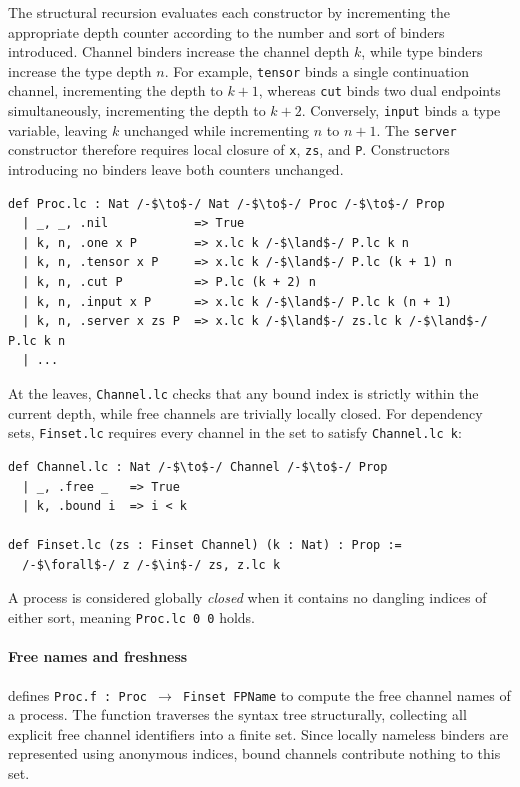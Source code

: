 The structural recursion evaluates each constructor by incrementing the appropriate depth counter according to the number and sort of binders introduced. Channel binders increase the channel depth $k$, while type binders increase the type depth $n$. For example, \texttt{tensor} binds a single continuation channel, incrementing the depth to $k+1$, whereas \texttt{cut} binds two dual endpoints simultaneously, incrementing the depth to $k+2$. Conversely, \texttt{input} binds a type variable, leaving $k$ unchanged while incrementing $n$ to $n+1$. The \texttt{server} constructor therefore requires local closure of \texttt{x}, \texttt{zs}, and \texttt{P}. Constructors introducing no binders leave both counters unchanged.

\begin{lstlisting}[language=Lean4]
def Proc.lc : Nat /-$\to$-/ Nat /-$\to$-/ Proc /-$\to$-/ Prop
  | _, _, .nil            => True
  | k, n, .one x P        => x.lc k /-$\land$-/ P.lc k n
  | k, n, .tensor x P     => x.lc k /-$\land$-/ P.lc (k + 1) n
  | k, n, .cut P          => P.lc (k + 2) n
  | k, n, .input x P      => x.lc k /-$\land$-/ P.lc k (n + 1)
  | k, n, .server x zs P  => x.lc k /-$\land$-/ zs.lc k /-$\land$-/ P.lc k n
  | ...
\end{lstlisting}

At the leaves, \texttt{Channel.lc} checks that any bound index is strictly within the current depth, while free channels are trivially locally closed. For dependency sets, \texttt{Finset.lc} requires every channel in the set to satisfy \texttt{Channel.lc k}:

\begin{lstlisting}[language=Lean4]
def Channel.lc : Nat /-$\to$-/ Channel /-$\to$-/ Prop
  | _, .free _   => True
  | k, .bound i  => i < k

def Finset.lc (zs : Finset Channel) (k : Nat) : Prop :=
  /-$\forall$-/ z /-$\in$-/ zs, z.lc k
\end{lstlisting}

A process is considered globally \emph{closed} when it contains no dangling indices of either sort, meaning \texttt{Proc.lc 0 0} holds.

\paragraph{Free names and freshness}  defines \texttt{Proc.f~: Proc $\to$ Finset FPName} to compute the free channel names of a process. The function traverses the syntax tree structurally, collecting all explicit free channel identifiers into a finite set. Since locally nameless binders are represented using anonymous indices, bound channels contribute nothing to this set.

